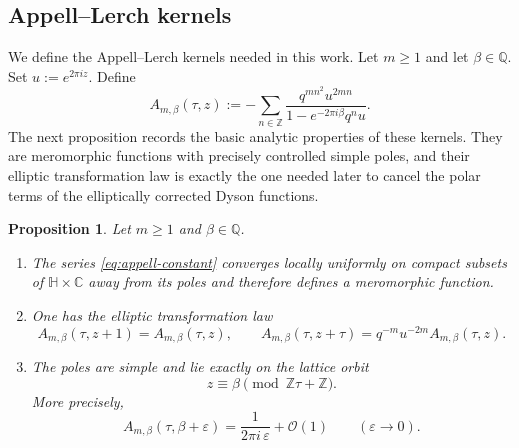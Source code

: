 \documentclass[12pt]{amsart}
\numberwithin{equation}{section}
\newtheorem{proposition}[theorem]{Proposition}
\newcommand{\CC}{\mathbb C}
\newcommand{\HH}{\mathbb H}
\newcommand{\QQ}{\mathbb Q}
\newcommand{\ZZ}{\mathbb Z}
\newcommand{\OO}{\mathcal O}
\begin{document}
\subsection{Appell--Lerch kernels}

We define the Appell--Lerch kernels needed in this work.
Let $m\geq 1$ and let $\beta\in\QQ$.  Set $u:=e^{2\pi i z}$.  Define
\begin{equation}\label{eq:appell-constant}
A_{m,\beta}(\tau,z)
:=
-\sum_{n\in\ZZ}
\frac{q^{mn^2}u^{2mn}}{1-e^{-2\pi i\beta}q^n u}.
\end{equation}
The next proposition records the basic analytic properties of these kernels.
They are meromorphic functions with precisely controlled simple poles, and their
elliptic transformation law is exactly the one needed later to cancel the polar
terms of the elliptically corrected Dyson functions.

\begin{proposition}\label{prop:appell-constant}
Let $m\geq 1$ and $\beta\in\QQ$.

\begin{enumerate}[label=\textnormal{(\arabic*)}]
\item The series \eqref{eq:appell-constant} converges locally uniformly on compact subsets of $\HH\times\CC$ away from its poles and therefore defines a meromorphic function.

\item One has the elliptic transformation law
\begin{equation}\label{eq:appell-elliptic}
A_{m,\beta}(\tau,z+1)=A_{m,\beta}(\tau,z),
\qquad
A_{m,\beta}(\tau,z+\tau)=q^{-m}u^{-2m}A_{m,\beta}(\tau,z).
\end{equation}

\item The poles are simple and lie exactly on the lattice orbit
\[
z\equiv \beta \pmod{\ZZ\tau+\ZZ}.
\]
More precisely,
\begin{equation}\label{eq:appell-local}
A_{m,\beta}(\tau,\beta+\varepsilon)
=
\frac1{2\pi i\,\varepsilon}+\OO(1)
\qquad (\varepsilon\to 0).
\end{equation}

\end{enumerate}
\end{proposition}
\end{document}
